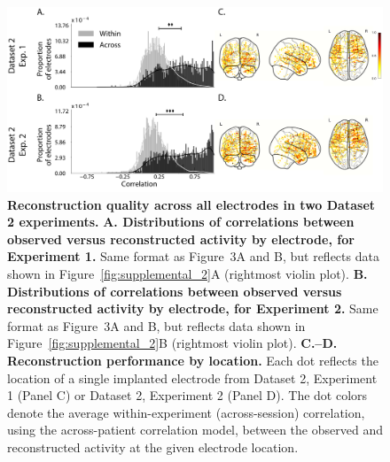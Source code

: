 \documentclass[10pt]{article}
\begin{document}
\begin{figure}[p]
\centering
\includegraphics[width=\textwidth]{figs/supplemental_3}
\caption{\textbf{Reconstruction quality across all electrodes in two
      Dataset 2 experiments.}  \textbf{A. Distributions of correlations
      between observed versus reconstructed activity by electrode, for
      Experiment 1.}  Same format as Figure~3A and B, but reflects data shown
    in Figure~\ref{fig:supplemental_2}A (rightmost violin plot).
 \textbf{B. Distributions of correlations
      between observed versus reconstructed activity by electrode, for
      Experiment 2.}  Same format as Figure~3A and B, but reflects
    data shown in Figure~\ref{fig:supplemental_2}B (rightmost violin
    plot).  \textbf{C.--D.  Reconstruction
      performance by location.} Each dot reflects the location of a
    single implanted electrode from Dataset 2, Experiment 1 (Panel C)
    or Dataset 2, Experiment 2 (Panel D).  The dot colors denote the
    average within-experiment (across-session)
    correlation, using the across-patient correlation model, between
    the observed and reconstructed activity at the given electrode
    location.}
\label{fig:supplemental_3}
\end{figure}
\end{document}
